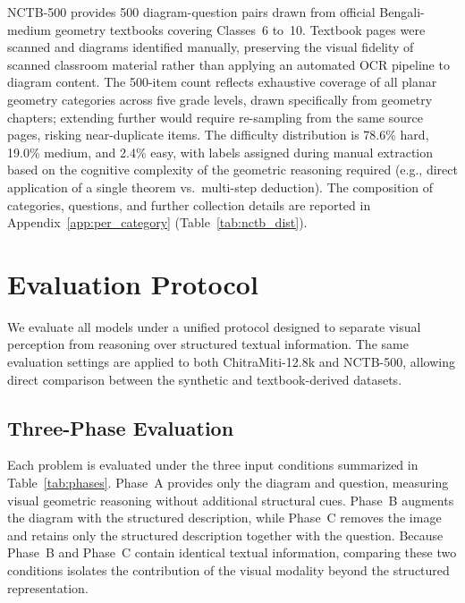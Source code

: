 \documentclass[11pt]{article}
\begin{document}
NCTB-500 provides 500 diagram-question pairs drawn from official Bengali-medium geometry textbooks covering Classes~6 to~10. Textbook pages were scanned and diagrams identified manually, preserving the visual fidelity of scanned classroom material rather than applying an automated OCR pipeline to diagram content. The 500-item count reflects exhaustive coverage of all planar geometry categories across five grade levels, drawn specifically from geometry chapters; extending further would require re-sampling from the same source pages, risking near-duplicate items. The difficulty distribution is 78.6\% hard, 19.0\% medium, and 2.4\% easy, with labels assigned during manual extraction based on the cognitive complexity of the geometric reasoning required (e.g., direct application of a single theorem vs.\ multi-step deduction). The composition of categories, questions, and further collection details are reported in Appendix~\ref{app:per_category} (Table~\ref{tab:nctb_dist}).

\section{Evaluation Protocol}
\label{sec:protocol}

We evaluate all models under a unified protocol designed to separate visual perception from reasoning over structured textual information. The same evaluation settings are applied to both ChitraMiti-12.8k and NCTB-500, allowing direct comparison between the synthetic and textbook-derived datasets.

\subsection{Three-Phase Evaluation}
\label{ssec:phases}

Each problem is evaluated under the three input conditions summarized in Table~\ref{tab:phases}. Phase~A provides only the diagram and question, measuring visual geometric reasoning without additional structural cues. Phase~B augments the diagram with the structured description, while Phase~C removes the image and retains only the structured description together with the question. Because Phase~B and Phase~C contain identical textual information, comparing these two conditions isolates the contribution of the visual modality beyond the structured representation.

\begin{table}[ht]
\centering
\caption{Three-phase evaluation protocol.}
\label{tab:phases}
\footnotesize
{}
\end{table}
\end{document}
